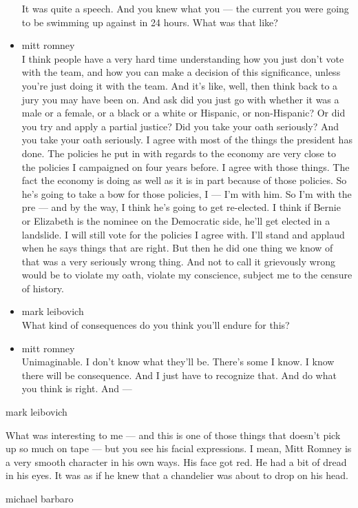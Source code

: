 \begin{itemize}
  It was quite a speech. And you knew what you --- the current you were
  going to be swimming up against in 24 hours. What was that like?
\item
  mitt romney\\
  I think people have a very hard time understanding how you just don't
  vote with the team, and how you can make a decision of this
  significance, unless you're just doing it with the team. And it's
  like, well, then think back to a jury you may have been on. And ask
  did you just go with whether it was a male or a female, or a black or
  a white or Hispanic, or non-Hispanic? Or did you try and apply a
  partial justice? Did you take your oath seriously? And you take your
  oath seriously. I agree with most of the things the president has
  done. The policies he put in with regards to the economy are very
  close to the policies I campaigned on four years before. I agree with
  those things. The fact the economy is doing as well as it is in part
  because of those policies. So he's going to take a bow for those
  policies, I --- I'm with him. So I'm with the pre --- and by the way,
  I think he's going to get re-elected. I think if Bernie or Elizabeth
  is the nominee on the Democratic side, he'll get elected in a
  landslide. I will still vote for the policies I agree with. I'll stand
  and applaud when he says things that are right. But then he did one
  thing we know of that was a very seriously wrong thing. And not to
  call it grievously wrong would be to violate my oath, violate my
  conscience, subject me to the censure of history.
\item
  mark leibovich\\
  What kind of consequences do you think you'll endure for this?
\item
  mitt romney\\
  Unimaginable. I don't know what they'll be. There's some I know. I
  know there will be consequence. And I just have to recognize that. And
  do what you think is right. And ---
\end{itemize}

mark leibovich

What was interesting to me --- and this is one of those things that
doesn't pick up so much on tape --- but you see his facial expressions.
I mean, Mitt Romney is a very smooth character in his own ways. His face
got red. He had a bit of dread in his eyes. It was as if he knew that a
chandelier was about to drop on his head.

michael barbaro

